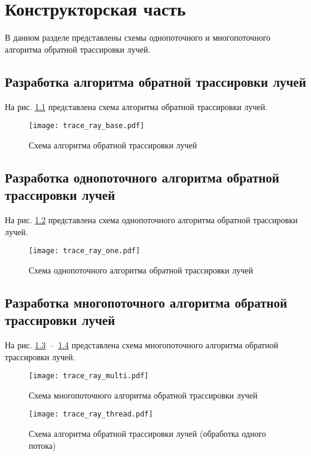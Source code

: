 \chapter{Конструкторская часть}

В данном разделе представлены схемы однопоточного и многопоточного алгоритма обратной трассировки лучей.

\section{Разработка алгоритма обратной трассировки лучей}
На рис. \ref{img:trace_ray_base} представлена схема алгоритма обратной трассировки лучей.

\begin{figure}[h!]
\centering
    \texttt{[image: trace\_ray\_base.pdf]}
    \caption{Схема алгоритма обратной трассировки лучей}
    \label{img:trace_ray_base}	
\end{figure}

\newpage

\section{Разработка однопоточного алгоритма обратной трассировки лучей}
На рис. \ref{img:trace_ray_one} представлена схема однопоточного алгоритма обратной трассировки лучей.

\begin{figure}[h!]
\centering
    \texttt{[image: trace\_ray\_one.pdf]}
    \caption{Схема однопоточного алгоритма обратной трассировки лучей}
    \label{img:trace_ray_one}	
\end{figure}

\section{Разработка многопоточного алгоритма обратной трассировки лучей}
На рис. \ref{img:trace_ray_multi}~--~\ref{img:trace_ray_thread} представлена схема многопоточного алгоритма обратной трассировки лучей.

\newpage

\begin{figure}[h!]
\centering
    \texttt{[image: trace\_ray\_multi.pdf]}
    \caption{Схема многопоточного алгоритма обратной трассировки лучей}
    \label{img:trace_ray_multi}	
\end{figure}

\begin{figure}[h!]
\centering
    \texttt{[image: trace\_ray\_thread.pdf]}
    \caption{Схема алгоритма обратной трассировки лучей (обработка одного потока)}
    \label{img:trace_ray_thread}	
\end{figure}

\newpage